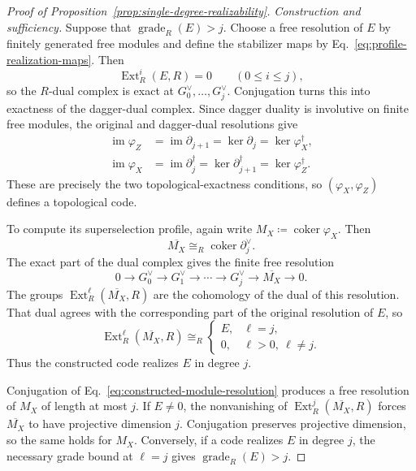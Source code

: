 \documentclass[aps,prx,english,superscriptaddress,twocolumn,tightenlines,showpacs,longbibliography,floatfix,amsfonts]{revtex4-2}
\theoremstyle{remark}
\theoremstyle{definition}
\begin{document}
\begin{proof}[Proof of Proposition~\ref{prop:single-degree-realizability}]
	\emph{Construction and sufficiency.}
	Suppose that \(\operatorname{grade}_R(E)>j\). Choose a free resolution of
	\(E\) by finitely generated free modules and define the stabilizer maps by
	Eq.~\eqref{eq:profile-realization-maps}. Then
	\begin{equation}
		\operatorname{Ext}_R^i(E,R)=0
		\qquad(0\leq i\leq j),
	\end{equation}
	so the \(R\)-dual complex is exact at
	\(G_0^\vee,\ldots,G_j^\vee\). Conjugation turns this into exactness of the
	dagger-dual complex. Since dagger duality is involutive on finite free
	modules, the original and dagger-dual resolutions give
	\begin{equation}
		\begin{aligned}
			\operatorname{im}\varphi_Z
			&=\operatorname{im}\partial_{j+1}
			=\ker\partial_j
			=\ker\varphi_X^\dagger,\\
			\operatorname{im}\varphi_X
			&=\operatorname{im}\partial_j^\dagger
			=\ker\partial_{j+1}^\dagger
			=\ker\varphi_Z^\dagger.
		\end{aligned}
	\end{equation}
	These are precisely the two topological-exactness conditions, so
	\((\varphi_X,\varphi_Z)\) defines a topological code.

	To compute its superselection profile, again write
	\(M_X\coloneqq\operatorname{coker}\varphi_X\). Then
	\begin{equation}
		\overline{M_X}
		\cong_R
		\operatorname{coker}\partial_j^\vee.
	\end{equation}
	The exact part of the dual complex gives the finite free resolution
	\begin{equation}
		0\longrightarrow G_0^\vee\longrightarrow G_1^\vee
		\longrightarrow\cdots\longrightarrow G_j^\vee
		\longrightarrow \overline{M_X}\longrightarrow0.
		\label{eq:constructed-module-resolution}
	\end{equation}
	The groups \(\operatorname{Ext}_R^\ell(\overline{M_X},R)\) are the
	cohomology of the dual of this resolution. That dual agrees with the
	corresponding part of the original resolution of \(E\), so
	\begin{equation}
		\operatorname{Ext}_R^\ell(\overline{M_X},R)
		\cong_R
		\begin{cases}
			E, & \ell=j,\\
			0, & \ell>0,\ \ell\neq j.
		\end{cases}
	\end{equation}
	Thus the constructed code realizes \(E\) in degree \(j\).

	Conjugation of Eq.~\eqref{eq:constructed-module-resolution} produces a
	free resolution of \(M_X\) of length at most
	\(j\). If \(E\neq0\), the nonvanishing of
	\(\operatorname{Ext}_R^j(\overline{M_X},R)\) forces
	\(\overline{M_X}\) to have projective dimension \(j\). Conjugation
	preserves projective dimension, so the same holds for \(M_X\). Conversely,
	if a code realizes \(E\)
	in degree \(j\), the necessary grade bound at \(\ell=j\) gives
	\(\operatorname{grade}_R(E)>j\).
\end{proof}
\end{document}
